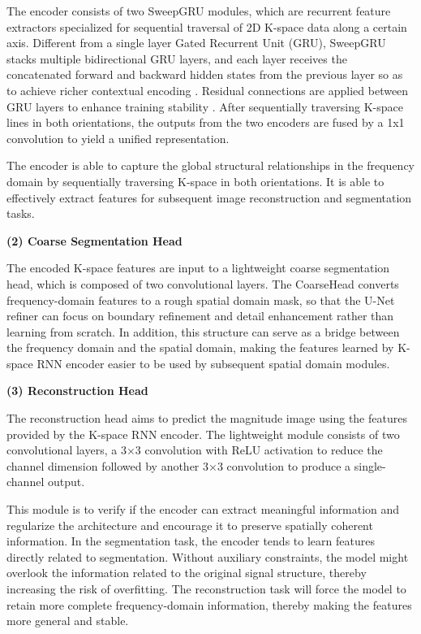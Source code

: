 \documentclass[12pt,a4paper]{article}
\begin{document}
The encoder consists of two SweepGRU modules, which are recurrent feature extractors specialized for sequential traversal of 2D K-space data along a certain axis. Different from a single layer Gated Recurrent Unit (GRU), SweepGRU stacks multiple bidirectional GRU layers, and each layer receives the concatenated forward and backward hidden states from the previous layer so as to achieve richer contextual encoding \cite{22}. Residual connections are applied between GRU layers to enhance training stability \cite{23}. After sequentially traversing K-space lines in both orientations, the outputs from the two encoders are fused by a 1x1 convolution to yield a unified representation.

The encoder is able to capture the global structural relationships in the frequency domain by sequentially traversing K-space in both orientations. It is able to effectively extract features for subsequent image reconstruction and segmentation tasks.


\noindent \textbf{(2) Coarse Segmentation Head}

The encoded K-space features are input to a lightweight coarse segmentation head, which is composed of two convolutional layers. The CoarseHead converts frequency-domain features to a rough spatial domain mask, so that the U-Net refiner can focus on boundary refinement and detail enhancement rather than learning from scratch. In addition, this structure can serve as a bridge between the frequency domain and the spatial domain, making the features learned by K-space RNN encoder easier to be used by subsequent spatial domain modules.


\noindent \textbf{(3) Reconstruction Head}

The reconstruction head aims to predict the magnitude image using the features provided by the K-space RNN encoder. The lightweight module consists of two convolutional layers, a 3×3 convolution with ReLU activation to reduce the channel dimension followed by another 3×3 convolution to produce a single-channel output. 

This module is to verify if the encoder can extract meaningful information and regularize the architecture and encourage it to preserve spatially coherent information. In the segmentation task, the encoder tends to learn features directly related to segmentation. Without auxiliary constraints, the model might overlook the information related to the original signal structure, thereby increasing the risk of overfitting. The reconstruction task will force the model to retain more complete frequency-domain information, thereby making the features more general and stable.
\end{document}

